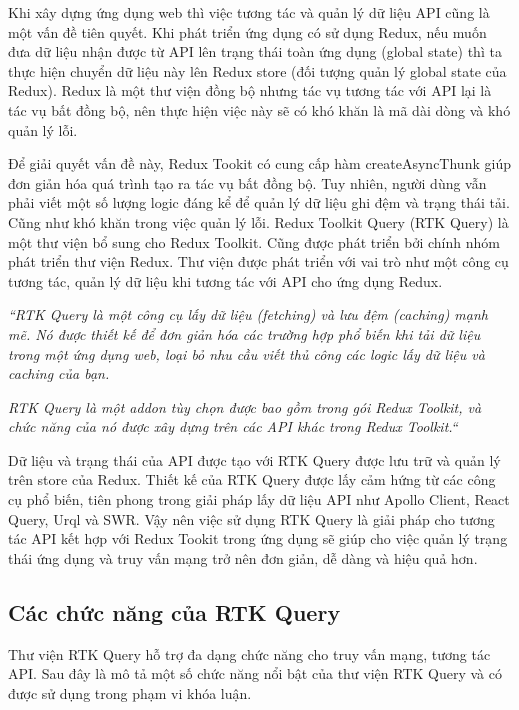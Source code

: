 \tab \tab Khi xây dựng ứng dụng web thì việc tương tác và quản lý dữ liệu API cũng là một vấn đề tiên quyết.
Khi phát triển ứng dụng có sử dụng Redux, nếu muốn đưa dữ liệu nhận được từ API lên trạng thái toàn ứng dụng (global state) thì ta thực hiện chuyển dữ liệu này lên Redux store (đối tượng quản lý global state của Redux).
Redux là một thư viện đồng bộ nhưng tác vụ tương tác với API lại là tác vụ bất đồng bộ, nên thực hiện việc này sẽ có khó khăn là mã dài dòng và khó quản lý lỗi.

Để giải quyết vấn đề này, Redux Tookit có cung cấp hàm createAsyncThunk giúp đơn giản hóa quá trình tạo ra tác vụ bất đồng bộ.
Tuy nhiên, người dùng vẫn phải viết một số lượng logic đáng kể để quản lý dữ liệu ghi đệm và trạng thái tải.
Cũng như khó khăn trong việc quản lý lỗi.
Redux Toolkit Query (RTK Query) là một thư viện bổ sung cho Redux Toolkit.
Cũng được phát triển bởi chính nhóm phát triển thư viện Redux.
Thư viện được phát triển với vai trò như một công cụ tương tác, quản lý dữ liệu khi tương tác với API cho ứng dụng Redux.
\par

\textit{“RTK Query là một công cụ lấy dữ liệu (fetching) và lưu đệm (caching) mạnh mẽ.
      Nó được thiết kế để đơn giản hóa các trường hợp phổ biến khi tải dữ liệu trong một ứng dụng web, loại bỏ nhu cầu viết thủ công các logic lấy dữ liệu và caching của bạn.}
\par

\textit{RTK Query là một addon tùy chọn được bao gồm trong gói Redux Toolkit, và chức năng của nó được xây dựng trên các API khác trong Redux Toolkit.“} \cite{chap4bib2}
\par

Dữ liệu và trạng thái của API được tạo với RTK Query được lưu trữ và quản lý trên store của Redux.
Thiết kế của RTK Query được lấy cảm hứng từ các công cụ phổ biến, tiên phong trong giải pháp lấy dữ liệu API như Apollo Client, React Query, Urql và SWR.
Vậy nên việc sử dụng RTK Query là giải pháp cho tương tác API kết hợp với Redux Tookit trong ứng dụng sẽ giúp cho việc quản lý trạng thái ứng dụng và truy vấn mạng trở nên đơn giản, dễ dàng và hiệu quả hơn.

\subsection{Các chức năng của RTK Query}

\tab Thư viện RTK Query hỗ trợ đa dạng chức năng cho truy vấn mạng, tương tác API.
Sau đây là mô tả một số chức năng nổi bật của thư viện RTK Query và có được sử dụng trong phạm vi khóa luận.

